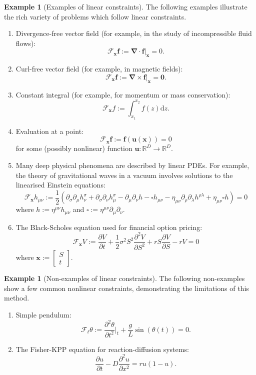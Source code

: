 \documentclass[12pt,a4paper,twoside]{report}
\theoremstyle{definition}
\newtheorem{exmp}[thm]{Example}
\newcommand{\f}{\mathscr F_\mathbf x}
\begin{document}
\begin{exmp}[Examples of linear constraints]\label{example}
	The following examples illustrate the rich variety of problems which follow linear constraints.
	\begin{enumerate}
		\item Divergence-free vector field (for example, in the study of incompressible fluid flows):
			$$\mathscr F_\mathbf x \mathbf f := \boldsymbol \nabla \cdot \mathbf f|_{\mathbf x} = 0.$$
		\item Curl-free vector field (for example, in magnetic fields):
			$$\f \mathbf f := \boldsymbol \nabla \times \mathbf f|_{\mathbf x} = \mathbf 0.$$
		\item Constant integral (for example, for momentum or mass conservation):
			$$\mathscr F_{\mathbf x} f:= \int_{x_1}^{x_2} f(z)\mathrm d z.$$
		\item Evaluation at a point:
			$$\f \mathbf f:= \mathbf f(\mathbf u(\mathbf x))=0$$
			for some (possibly nonlinear) function $\mathbf u:\mathbb{R}^D\to\mathbb{R}^D$.
		\item Many deep physical phenomena are described by linear PDEs. For example, the theory of gravitational waves in a vacuum involves solutions to the linearised Einstein equations:
			$$\f h_{\mu\nu} := \frac{1}{2}(\partial _\sigma \partial _\mu h^\sigma_\nu + \partial_\sigma \partial _\nu h^\sigma_\mu - \partial _\mu \partial _\nu h - \square h_{\mu\nu} - \eta_{\mu\nu}\partial _\rho\partial _\lambda h^{\rho \lambda} + \eta_{\mu\nu}\square h)=0$$
			where $h:=\eta^{\mu\nu}h_{\mu\nu}$ and $\square := \eta^{\mu\nu}\partial _\mu\partial _\nu.$ 
		\item The Black-Scholes equation used for financial option pricing:
			$$\f V:= \frac{\partial V}{\partial t} + \frac{1}{2} \sigma^2 S^2 \frac{\partial ^2 V}{\partial S^2} + rS \frac{\partial V}{\partial S} - rV =0$$
			where $\mathbf x:=\begin{bmatrix}S\\t\end{bmatrix}$.
	\end{enumerate}
\end{exmp}

\begin{exmp}[Non-examples of linear constraints]
	The following non-examples show a few common nonlinear constraints, demonstrating the limitations of this method.
	\begin{enumerate}
		\item Simple pendulum:
	$$\mathscr{F}_t \theta:= \frac{\partial ^2 \theta}{\partial t^2}\bigg|_t + \frac{g}{L}\sin(\theta(t))=0.$$
\item The Fisher-KPP equation for reaction-diffusion systems:
	$$\frac{\partial u}{\partial t} - D \frac{\partial ^2 u}{\partial x^2} = ru(1-u).$$
	\end{enumerate}
\end{exmp}
\end{document}
